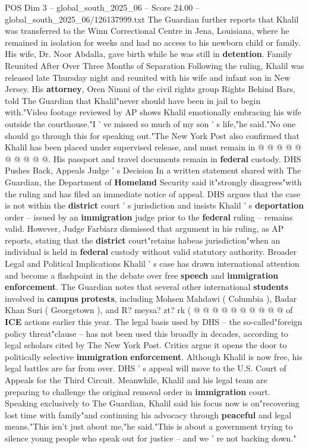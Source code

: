 \begin{textsample}{POS Dim 3 – global\_south\_2025\_06 – Score 24.00 – global\_south\_2025\_06/126137999.txt}
The Guardian further reports that Khalil was transferred to the Winn Correctional Centre in Jena, Louisiana, where he remained in isolation for weeks and had no access to his newborn child or family.
His wife, Dr.
Noor Abdalla, gave birth while he was still in \textbf{detention}.
Family Reunited After Over Three Months of Separation Following the ruling, Khalil was released late Thursday night and reunited with his wife and infant son in New Jersey.
His \textbf{attorney}, Oren Nimni of the civil rights group Rights Behind Bars, told The Guardian that Khalil"never should have been in jail to begin with."Video footage reviewed by AP shows Khalil emotionally embracing his wife outside the courthouse."I ' ve missed so much of my son ' s life,"he said."No one should go through this for speaking out."The New York Post also confirmed that Khalil has been placed under supervised release, and must remain in @ @ @ @ @ @ @ @ @ @.
His passport and travel documents remain in \textbf{federal} custody.
DHS Pushes Back, Appeals Judge ' s Decision In a written statement shared with The Guardian, the Department of \textbf{Homeland} Security said it"strongly disagrees"with the ruling and has filed an immediate notice of appeal.
DHS argues that the case is not within the \textbf{district} court ' s jurisdiction and insists Khalil ' s \textbf{deportation} order -- issued by an \textbf{immigration} judge prior to the \textbf{federal} ruling -- remains valid.
However, Judge Farbiarz dismissed that argument in his ruling, as AP reports, stating that the \textbf{district} court"retains habeas jurisdiction"when an individual is held in \textbf{federal} custody without valid statutory authority.
Broader Legal and Political Implications Khalil ' s case has drawn international attention and become a flashpoint in the debate over free \textbf{speech} and \textbf{immigration} \textbf{enforcement}.
The Guardian notes that several other international \textbf{students} involved in \textbf{campus} \textbf{protests}, including Mohsen Mahdawi ( Columbia ), Badar Khan Suri ( Georgetown ), and R? meysa? zt? rk ( @ @ @ @ @ @ @ @ @ @ of \textbf{ICE} actions earlier this year.
The legal basis used by DHS -- the so-called"foreign policy threat"clause -- has not been used this broadly in decades, according to legal scholars cited by The New York Post.
Critics argue it opens the door to politically selective \textbf{immigration} \textbf{enforcement}.
Although Khalil is now free, his legal battles are far from over.
DHS ' s appeal will move to the U.S.
Court of Appeals for the Third Circuit.
Meanwhile, Khalil and his legal team are preparing to challenge the original removal order in \textbf{immigration} court.
Speaking exclusively to The Guardian, Khalil said his focus now is on"recovering lost time with family"and continuing his advocacy through \textbf{peaceful} and legal means."This isn't just about me,"he said."This is about a government trying to silence young people who speak out for justice -- and we ' re not backing down."


\end{textsample}
